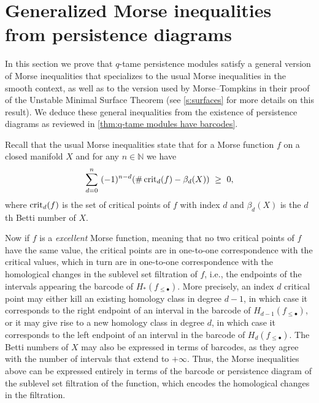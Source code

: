 
\section{Generalized Morse inequalities from persistence diagrams} \label{s:inequalities}

In this section we prove that $q$-tame persistence modules satisfy a general version of Morse inequalities that specializes to the usual Morse inequalities in the smooth context, as well as to the version used by Morse--Tompkins in their proof of the Unstable Minimal Surface Theorem (see \cref{s:surfaces} for more details on this result).
We deduce these general inequalities from the existence of persistence diagrams as reviewed in \cref{thm:q-tame modules have barcodes}.

Recall that the usual Morse inequalities state that for a Morse function $f$ on a closed manifold $X$ and for any $n \in \mathbb N$ we have
\begin{equation}\label{equ:morse_inequalities}
    \sum_{d=0}^n \ (-1)^{n-d} ( \# \crit_{d}(f) - \beta_{d}(X) ) \ \geq\  0,  
\end{equation}
where $\operatorname{crit}_{d}(f)$ is the set of critical points of $f$ with index $d$ and $\beta_{d}(X)$ is the $d$th Betti number of $X$. 

Now if $f$ is a \emph{excellent} Morse function, meaning that no two critical points of $f$ have the same value, the critical points are in one-to-one correspondence with the critical values, which in turn are in one-to-one correspondence with the homological changes in the sublevel set filtration of $f$, i.e., the endpoints of the intervals appearing the barcode of $H_*(f_{\leq \bullet})$. 
More precisely, an index $d$ critical point may either kill an existing homology class in degree $d-1$, in which case it corresponds to the right endpoint of an interval in the barcode of $H_{d-1}(f_{\leq \bullet})$, or it may give rise to a new homology class in degree $d$, in which case it corresponds to the left endpoint of an interval in the barcode of $H_d(f_{\leq \bullet})$.
The Betti numbers of $X$ may also be expressed in terms of barcodes, as they agree with the number of intervals that extend to $+\infty$. 
Thus, the Morse inequalities above can be expressed entirely in terms of the barcode or persistence diagram of the sublevel set filtration of the function, which encodes the homological changes in the filtration.

